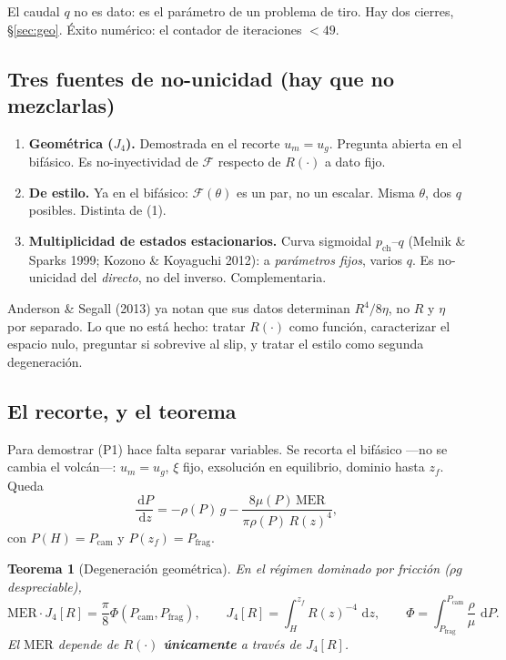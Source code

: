 \documentclass[11pt,a4paper]{article}
\theoremstyle{plain}
\newtheorem{teorema}{Teorema}
\theoremstyle{definition}
\theoremstyle{remark}
\newcommand{\MER}{\mathrm{MER}}
\newcommand{\dd}{\,\mathrm{d}}
\newcommand{\F}{\mathcal{F}}
\begin{document}
El caudal $q$ no es dato: es el parámetro de un problema de tiro.
Hay dos cierres, \S\ref{sec:geo}. Éxito numérico: el contador de
iteraciones $<49$.

\subsection{Tres fuentes de no-unicidad (hay que no mezclarlas)}

\begin{enumerate}
\item \textbf{Geométrica ($J_4$).}
  Demostrada en el recorte $u_m=u_g$. Pregunta abierta en el
  bifásico. Es no-inyectividad de $\F$ respecto de $R(\cdot)$ a
  dato fijo.
\item \textbf{De estilo.}
  Ya en el bifásico: $\F(\theta)$ es un par, no un escalar. Misma
  $\theta$, dos $q$ posibles. Distinta de (1).
\item \textbf{Multiplicidad de estados estacionarios.}
  Curva sigmoidal $p_{\mathrm{ch}}$--$q$ (Melnik \& Sparks 1999;
  Kozono \& Koyaguchi 2012): a \emph{parámetros fijos}, varios $q$.
  Es no-unicidad del \emph{directo}, no del inverso. Complementaria.
\end{enumerate}

Anderson \& Segall (2013) ya notan que sus datos determinan
$R^4/8\eta$, no $R$ y $\eta$ por separado. Lo que no está hecho:
tratar $R(\cdot)$ como función, caracterizar el espacio nulo,
preguntar si sobrevive al slip, y tratar el estilo como segunda
degeneración.

\subsection{El recorte, y el teorema}

Para demostrar (P1) hace falta separar variables. Se recorta el
bifásico ---no se cambia el volcán---: $u_m=u_g$, $\xi$ fijo,
exsolución en equilibrio, dominio hasta $z_f$. Queda
\begin{equation}
\label{eq:lub}
\frac{\dd P}{\dd z}
=-\rho(P)\,g-\frac{8\mu(P)\,\MER}{\pi\rho(P)\,R(z)^4},
\end{equation}
con $P(H)=P_{\mathrm{cam}}$ y $P(z_f)=P_{\mathrm{frag}}$.

\begin{teorema}[Degeneración geométrica]
En el régimen dominado por fricción ($\rho g$ despreciable),
\begin{equation}
\label{eq:J4}
\MER\cdot J_4[R]
=\frac{\pi}{8}\Phi(P_{\mathrm{cam}},P_{\mathrm{frag}}),\qquad
J_4[R]=\int_H^{z_f}R(z)^{-4}\,\dd z,\qquad
\Phi=\int_{P_{\mathrm{frag}}}^{P_{\mathrm{cam}}}\frac{\rho}{\mu}\,\dd P.
\end{equation}
El $\MER$ depende de $R(\cdot)$ \textbf{únicamente} a través de
$J_4[R]$.
\end{teorema}
\end{document}
